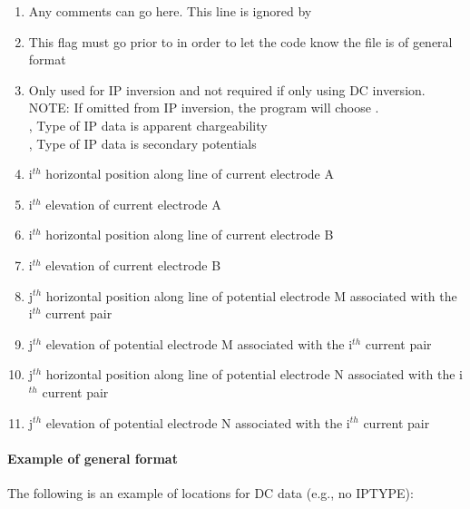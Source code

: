 \begin{enumerate}
\item[\codeName{Comment Line}] Any comments can go here. This line is ignored by 
\item[\codeName{COMMON\_CURRENT}] This flag must go prior to  in order to let the code know the file is of general format
\item[\codeName{IPTYPE}] Only used for IP inversion and not required if only using DC inversion. NOTE: If omitted from IP inversion, the program will choose . \\
     , Type of IP data is apparent chargeability \\
		 , Type of IP data is secondary potentials
%
\item[\codeName{A$_i^x$}] i$^{th}$ horizontal position along line of current electrode A
\item[\codeName{A$_i^z$}] i$^{th}$ elevation of current electrode A
\item[\codeName{B$_i^x$}] i$^{th}$ horizontal position along line of current electrode B
\item[\codeName{B$_i^z$}] i$^{th}$ elevation of current electrode B
\item[\codeName{M$_j^x$}] j$^{th}$ horizontal position along line of potential electrode M associated with the i$^{th}$ current pair
\item[\codeName{M$_j^z$}] j$^{th}$ elevation of potential electrode M associated with the i$^{th}$ current pair
\item[\codeName{N$_j^x$}] j$^{th}$ horizontal position along line of potential electrode N associated with the i$^{th}$ current pair
\item[\codeName{N$_j^z$}] j$^{th}$ elevation of potential electrode N associated with the i$^{th}$ current pair
\end{enumerate}

\paragraph{Example of general format} 

The following is an example of locations for DC data (e.g., no IPTYPE):


